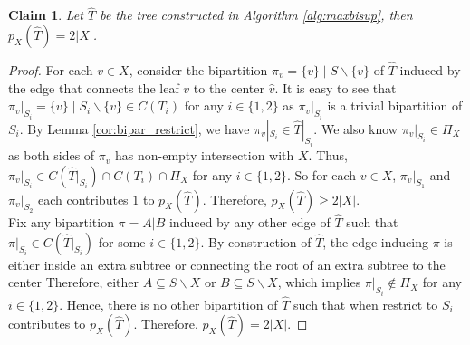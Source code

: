 \documentclass{bmcart}
\newtheorem{claim}{Claim}
\begin{document}
\begin{claim} \label{claim:begin}
    Let $\hat{T}$ be the tree constructed in Algorithm \ref{alg:maxbisup}, then $p_X(\hat{T}) = 2 |X|$. 
\end{claim}
\begin{proof}
    For each $v \in X$, consider the bipartition $\pi_v = \{v\}\mid S \backslash \{v\}$ of $\hat{T}$ induced by the edge that connects the leaf $v$ to the center $\hat{v}$. It is easy to see that $\pi_v|_{S_i} = \{v\} \mid S_i \backslash \{v\} \in C(T_i)$ for any $i\in\{1,2\}$ as $\pi_v|_{S_i}$ is a trivial bipartition of $S_i$. By Lemma \ref{cor:bipar_restrict}, we have $\pi_v|_{S_i} \in \hat{T}|_{S_i}$. We also know $\pi_v|_{S_i} \in \Pi_X$ as both sides of $\pi_v$ has non-empty intersection with $X$. Thus, $\pi_v|_{S_i} \in C(\hat{T}|_{S_i}) \cap C(T_i) \cap \Pi_X$ for any $i \in \{1,2\}$. So for each $v \in X$, $\pi_v|_{S_1}$ and $\pi_v|_{S_2}$ each contributes $1$ to $p_X(\hat{T})$. Therefore, $p_X(\hat{T}) \ge 2|X|$. \\
    
    Fix any bipartition $\pi = A|B$ induced by any other edge of $\hat{T}$ such that $\pi|_{S_i} \in C(\hat{T}|_{S_i})$ for some $i \in \{1,2\}$. By construction of $\hat{T}$, the edge inducing $\pi$ is either inside an extra subtree or connecting the root of an extra subtree to the center Therefore, either $A \subseteq S\backslash X $ or $B \subseteq S \backslash X$, which implies $\pi|_{S_i} \notin \Pi_X$ for any $i \in \{1,2\}$. Hence, there is no other bipartition of $\hat{T}$ such that when restrict to $S_i$ contributes to $p_X(\hat{T})$. Therefore, $p_X(\hat{T}) = 2|X|$.
\end{proof}
\end{document}
